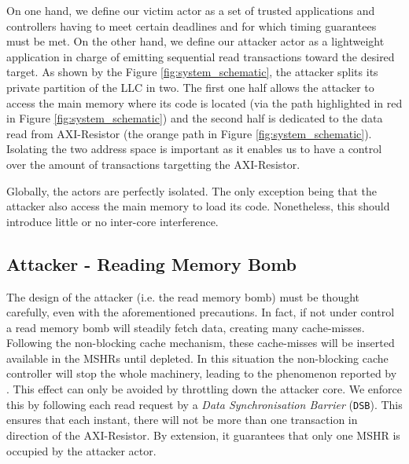         On one hand, we define our victim actor as a set of trusted applications and controllers having to meet certain deadlines and for which timing guarantees must be met.
        On the other hand, we define our attacker actor as a lightweight application in charge of emitting sequential read transactions toward the desired target.
        As shown by the Figure \ref{fig:system_schematic}, the attacker splits its private partition of the LLC in two.
        The first one half allows the attacker to access the main memory where its code is located (via the path highlighted in red in Figure \ref{fig:system_schematic}) and the second half is dedicated to the data read from AXI-Resistor (the orange path in Figure \ref{fig:system_schematic}).
        Isolating the two address space is important as it enables us to have a control over the amount of transactions targetting the AXI-Resistor.

        Globally, the actors are perfectly isolated.
        The only exception being that the attacker also access the main memory to load its code.
        Nonetheless, this should introduce little or no inter-core interference.

    \subsection{Attacker - Reading Memory Bomb}
        \label{subsec:attacker_reading_memory_bomb}
        The design of the attacker (i.e. the read memory bomb) must be thought carefully, even with the aforementioned precautions.
        In fact, if not under control a read memory bomb will steadily fetch data, creating many cache-misses.
        Following the non-blocking cache mechanism, these cache-misses will be inserted available in the MSHRs until depleted.
        In this situation the non-blocking cache controller will stop the whole machinery, leading to the phenomenon reported by \cite{Heechul_DDOS_attacks_on_shared_cache}.
        This effect can only be avoided by throttling down the attacker core.
        We enforce this by following each read request by a \emph{Data Synchronisation Barrier} (\texttt{DSB}).
        This ensures that each instant, there will not be more than one transaction in direction of the AXI-Resistor.
        By extension, it guarantees that only one MSHR is occupied by the attacker actor.

